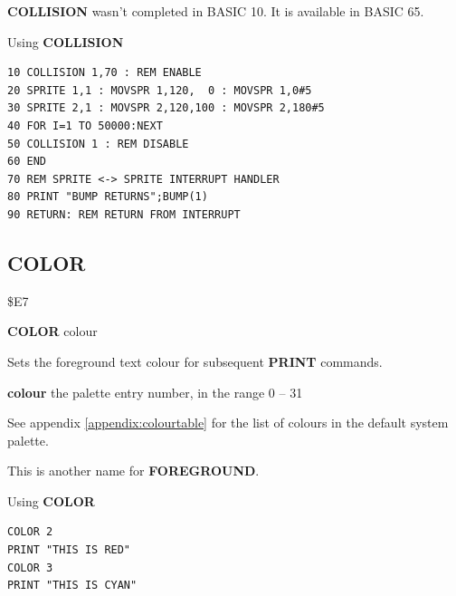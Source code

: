 \begin{description}[leftmargin=2cm,style=nextline]
\item [Info:] {\bf COLLISION} wasn't completed in BASIC 10. It is available in BASIC 65.

\item [Example:] Using {\bf COLLISION}
\begin{tcolorbox}[colback=black,coltext=white]
\verbatimfont{\codefont}
\begin{verbatim}
10 COLLISION 1,70 : REM ENABLE
20 SPRITE 1,1 : MOVSPR 1,120,  0 : MOVSPR 1,0#5
30 SPRITE 2,1 : MOVSPR 2,120,100 : MOVSPR 2,180#5
40 FOR I=1 TO 50000:NEXT
50 COLLISION 1 : REM DISABLE
60 END
70 REM SPRITE <-> SPRITE INTERRUPT HANDLER
80 PRINT "BUMP RETURNS";BUMP(1)
90 RETURN: REM RETURN FROM INTERRUPT
\end{verbatim}
\end{tcolorbox}
\end{description}


\newpage
\subsection{COLOR}
\begin{description}[leftmargin=2cm,style=nextline]
\item [Token:] \$E7
\item [Format:] {\bf COLOR} colour
\item [Usage:] Sets the foreground text colour for subsequent {\bf PRINT} commands.

               {\bf colour} the palette entry number, in the range 0 -- 31

               See appendix \vref{appendix:colourtable}
               for the list of colours in the default system palette.

\item [Remarks:] This is another name for {\bf FOREGROUND}.

\item [Example:] Using {\bf COLOR}
\begin{tcolorbox}[colback=black,coltext=white]
\verbatimfont{\codefont}
\begin{verbatim}
COLOR 2
PRINT "THIS IS RED"
COLOR 3
PRINT "THIS IS CYAN"
\end{verbatim}
\end{tcolorbox}
\end{description}


